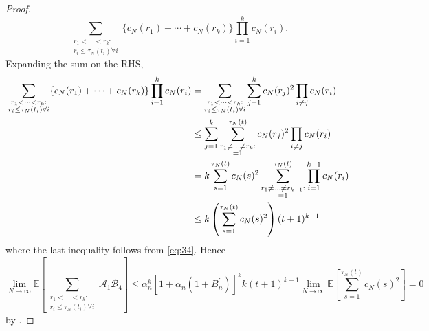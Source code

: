 \documentclass{article}
\newcommand{\E}{\mathbb{E}}
\newcommand{\1}[1]{\mathbbm{1}_{#1}}
\begin{document}
\begin{proof}
\begin{equation}
\sum_{\substack{r_1 <\dots< r_k :\\ r_i \leq \tau_N(t_i) \forall i}}
\{ c_N(r_1) + \cdots + c_N(r_k) \}
\prod_{i=1}^k  c_N(r_i) .
\end{equation}
Expanding the sum on the RHS,
\begin{align}
\sum_{\substack{r_1 <\dots< r_k :\\ r_i \leq \tau_N(t_i) \forall i}}
\{ c_N(r_1) + \cdots + c_N(r_k) \}
\prod_{i=1}^k  c_N(r_i)
&= \sum_{\substack{r_1 <\dots< r_k :\\ r_i \leq \tau_N(t_i) \forall i}}
\sum_{j=1}^k c_N(r_j)^2 \prod_{i\neq j} c_N(r_i) \notag\\
&\leq \sum_{j=1}^k \sum_{\substack{r_1 \neq \dots \neq r_k :\\ =1}}^{\tau_N(t)} c_N(r_j)^2 \prod_{i\neq j} c_N(r_i) \notag\\
&= k \sum_{s=1}^{\tau_N(t)} c_N(s)^2
\sum_{\substack{r_1 \neq \dots \neq r_{k-1} :\\ =1}}^{\tau_N(t)} \prod_{i=1}^{k-1} c_N(r_i) \notag\\
&\leq k \left( \sum_{s=1}^{\tau_N(t)} c_N(s)^2 \right) (t+1)^{k-1}
\end{align}
where the last inequality follows from \eqref{eq:34}.
Hence
\begin{equation}
\lim_{N\to\infty}\E\left[ \sum_{\substack{r_1 <\dots< r_k :\\ r_i \leq \tau_N(t_i) \forall i}} \mathscr{A}_1 \mathscr{B}_4 \right]
\leq \alpha_n^k \left[ 1 + \alpha_n (1 + B_n^\prime) \right]^k
k (t+1)^{k-1} \lim_{N\to\infty}\E\left[ \sum_{s=1}^{\tau_N(t)} c_N(s)^2 \right] =0
\end{equation}
by \citet[Equation (3.4)]{brown2021}.


\end{proof}
\end{document}
